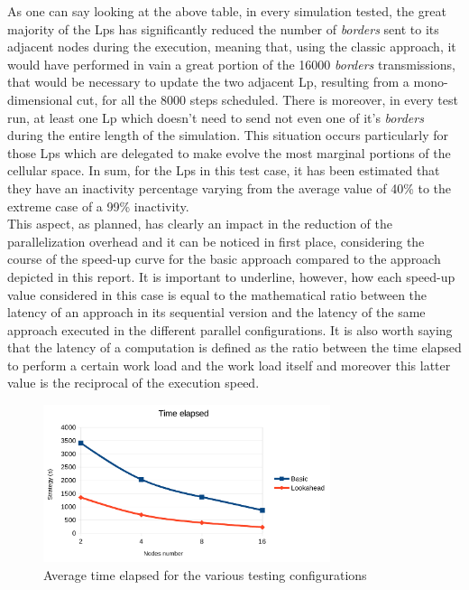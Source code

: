 \documentclass[12pt,a4paper,fleqn]{report}
\begin{document}
As one can say looking at the above table, in every simulation tested, the great majority of the Lps has significantly reduced the number of \textit{borders} sent to its adjacent nodes during the execution, meaning that, using the classic approach, it would have performed in vain a great portion of the 16000 \textit{borders} transmissions, that would be necessary to update the two adjacent Lp, resulting from a mono-dimensional cut, for all the 8000 steps scheduled. There is moreover, in every test run, at least one Lp which doesn't need to send not even one of it's \textit{borders} during the entire length of the simulation. This situation occurs particularly for those Lps which are delegated to make evolve the most marginal portions of the cellular space. In sum, for the Lps in this test case, it has been estimated that they have an inactivity percentage varying from the average value of 40\% to the extreme case of a 99\% inactivity.\\
This aspect, as planned, has clearly an impact in the reduction of the parallelization overhead and it can be noticed in first place, 
considering the course of the speed-up curve for the basic approach compared to the approach depicted in this report. 
It is important to underline, however, how each speed-up value considered 
in this case is equal to the mathematical ratio between the latency of an approach in its sequential
version and the latency of the same approach executed in the different parallel configurations.
It is also worth saying that the latency of a computation is defined as the ratio between the time elapsed 
to perform a certain work load and the work load itself and moreover this latter value is the reciprocal of the execution speed. 

 \begin{figure}[ht!]
\label{chart1}
\centering
	\vspace{13pt}
    \includegraphics[trim=0mm 10mm 0mm 10mm, width=0.75\textwidth]{time_elapsed}
    \caption{Average time elapsed for the various testing configurations}
\end{figure}
\end{document}

